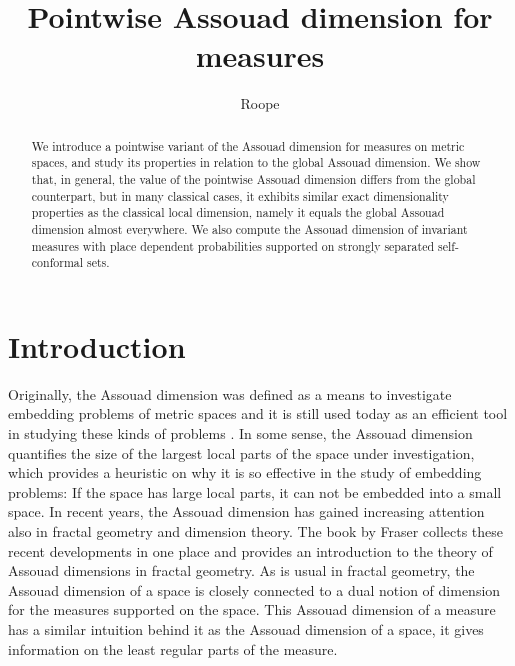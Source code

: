 \documentclass{PRM}
\theoremstyle{plain}
\theoremstyle{definition}
\theoremstyle{remark}
\begin{document}
\title{Pointwise Assouad dimension for measures}

\author{Roope }

\address{Research Unit of Mathematical Sciences\\  P.O.Box 8000, FI-90014, University of Oulu, Finland }

\begin{abstract}
    We introduce a pointwise variant of the Assouad dimension for measures on metric spaces, and study its properties in relation to the global Assouad dimension. We show that, in general, the value of the pointwise Assouad dimension differs from the global counterpart, but in many classical cases, it exhibits similar exact dimensionality properties as the classical local dimension, namely it equals the global Assouad dimension almost everywhere. We also compute the Assouad dimension of invariant measures with place dependent probabilities supported on strongly separated self-conformal sets. 
    \end{abstract}




\maketitle

\section{Introduction}
Originally, the Assouad dimension was defined as a means to investigate embedding problems of metric spaces \cite{A} and it is still used today as an efficient tool in studying these kinds of problems \cite{T}. In some sense, the Assouad dimension quantifies the size of the largest local parts of the space under investigation, which provides a heuristic on why it is so effective in the study of embedding problems: If the space has large local parts, it can not be embedded into a small space. In recent years, the Assouad dimension has gained increasing attention also in fractal geometry and dimension theory. The book by Fraser \cite{F} collects these recent developments in one place and provides an introduction to the theory of Assouad dimensions in fractal geometry. As is usual in fractal geometry, the Assouad dimension of a space is closely connected to a dual notion of dimension for the measures supported on the space. This Assouad dimension of a measure has a similar intuition behind it as the Assouad dimension of a space, it gives information on the least regular parts of the measure.
\end{document}
